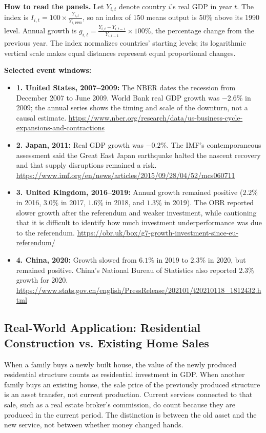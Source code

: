\documentclass[11pt,letterpaper]{article}
\begin{document}
\noindent\textbf{How to read the panels.} Let $Y_{i,t}$ denote country $i$'s real GDP in year $t$. The index is $I_{i,t}=100 \times \frac{Y_{i,t}}{Y_{i,1990}}$, so an index of 150 means output is 50\% above its 1990 level. Annual growth is $g_{i,t}=\frac{Y_{i,t}-Y_{i,t-1}}{Y_{i,t-1}}\times100\%$, the percentage change from the previous year. The index normalizes countries' starting levels; its logarithmic vertical scale makes equal distances represent equal proportional changes.

\noindent\textbf{Selected event windows:}
\begin{itemize}
    \item \textbf{1. United States, 2007--2009:} The NBER dates the recession from December 2007 to June 2009. World Bank real GDP growth was $-2.6\%$ in 2009; the annual series shows the timing and scale of the downturn, not a causal estimate. \url{https://www.nber.org/research/data/us-business-cycle-expansions-and-contractions}
    \item \textbf{2. Japan, 2011:} Real GDP growth was $-0.2\%$. The IMF's contemporaneous assessment said the Great East Japan earthquake halted the nascent recovery and that supply disruptions remained a risk. \url{https://www.imf.org/en/news/articles/2015/09/28/04/52/mcs060711}
    \item \textbf{3. United Kingdom, 2016--2019:} Annual growth remained positive ($2.2\%$ in 2016, $3.0\%$ in 2017, $1.6\%$ in 2018, and $1.3\%$ in 2019). The OBR reported slower growth after the referendum and weaker investment, while cautioning that it is difficult to identify how much investment underperformance was due to the referendum. \url{https://obr.uk/box/g7-growth-investment-since-eu-referendum/}
    \item \textbf{4. China, 2020:} Growth slowed from $6.1\%$ in 2019 to $2.3\%$ in 2020, but remained positive. China's National Bureau of Statistics also reported $2.3\%$ growth for 2020. \url{https://www.stats.gov.cn/english/PressRelease/202101/t20210118_1812432.html}
\end{itemize}

\subsection*{Real-World Application: Residential Construction vs. Existing Home Sales}
When a family buys a newly built house, the value of the newly produced residential structure counts as residential investment in GDP. When another family buys an existing house, the sale price of the previously produced structure is an asset transfer, not current production. Current services connected to that sale, such as a real estate broker's commission, do count because they are produced in the current period. The distinction is between the old asset and the new service, not between whether money changed hands.
\end{document}
